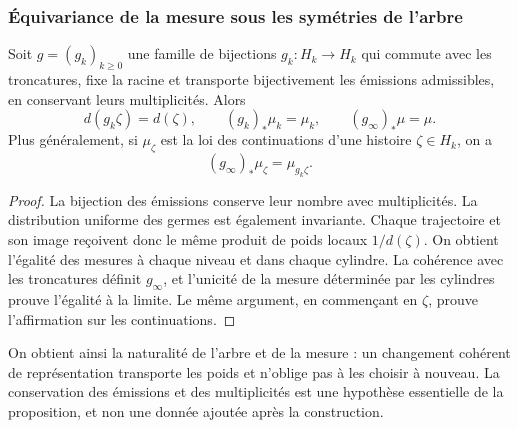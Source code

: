 \subsubsection{Équivariance de la mesure sous les symétries de l'arbre}
\label{ix:sec:ch-naturalidad-medida}

\begin{proposition}
\label{ix:prop:ch-naturalidad-medida}
Soit \(g=(g_k)_{k\geq0}\) une famille de bijections \(g_k:H_k\to H_k\)
qui commute avec les troncatures, fixe la racine et transporte bijectivement
les émissions admissibles, en conservant leurs multiplicités. Alors
\[
 d(g_k\zeta)=d(\zeta),\qquad
 (g_k)_*\mu_k=\mu_k,\qquad (g_\infty)_*\mu=\mu.
\]
Plus généralement, si \(\mu_\zeta\) est la loi des continuations d'une
histoire \(\zeta\in H_k\), on a
\[
 (g_\infty)_*\mu_\zeta=\mu_{g_k\zeta}.
\]
\end{proposition}

\begin{proof}
La bijection des émissions conserve leur nombre avec multiplicités. La
distribution uniforme des germes est également invariante. Chaque trajectoire
et son image reçoivent donc le même produit de poids locaux
\(1/d(\zeta)\). On obtient l'égalité des mesures à chaque niveau et dans
chaque cylindre. La cohérence avec les troncatures définit \(g_\infty\),
et l'unicité de la mesure déterminée par les cylindres prouve l'égalité
à la limite. Le même argument, en commençant en \(\zeta\), prouve
l'affirmation sur les continuations.
\end{proof}

On obtient ainsi la naturalité de l'arbre et de la mesure : un changement cohérent
de représentation transporte les poids et n'oblige pas à les choisir à nouveau.
La conservation des émissions et des multiplicités est une hypothèse essentielle de
la proposition, et non une donnée ajoutée après la construction.
